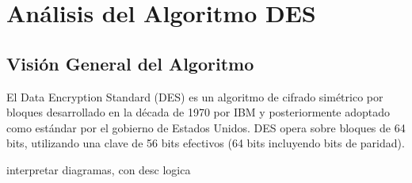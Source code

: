 \section{Análisis del Algoritmo DES}

\subsection{Visión General del Algoritmo}

El Data Encryption Standard (DES) es un algoritmo de cifrado simétrico por bloques desarrollado en la década de 1970 por IBM y posteriormente adoptado como estándar por el gobierno de Estados Unidos. DES opera sobre bloques de 64 bits, utilizando una clave de 56 bits efectivos (64 bits incluyendo bits de paridad).

interpretar diagramas, con desc logica 




